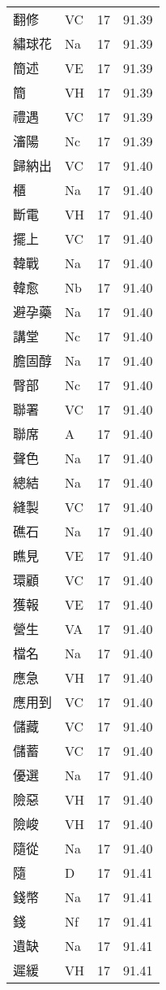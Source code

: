\documentclass[twocolumn]{book}
\begin{document}
\begin{supertabular}{llrr}
翻修 & VC & 17 &  91.39\\
繡球花 & Na & 17 &  91.39\\
簡述 & VE & 17 &  91.39\\
簡 & VH & 17 &  91.39\\
禮遇 & VC & 17 &  91.39\\
瀋陽 & Nc & 17 &  91.39\\
歸納出 & VC & 17 &  91.40\\
櫃 & Na & 17 &  91.40\\
斷電 & VH & 17 &  91.40\\
擺上 & VC & 17 &  91.40\\
韓戰 & Na & 17 &  91.40\\
韓愈 & Nb & 17 &  91.40\\
避孕藥 & Na & 17 &  91.40\\
講堂 & Nc & 17 &  91.40\\
膽固醇 & Na & 17 &  91.40\\
臀部 & Nc & 17 &  91.40\\
聯署 & VC & 17 &  91.40\\
聯席 & A & 17 &  91.40\\
聲色 & Na & 17 &  91.40\\
總結 & Na & 17 &  91.40\\
縫製 & VC & 17 &  91.40\\
礁石 & Na & 17 &  91.40\\
瞧見 & VE & 17 &  91.40\\
環顧 & VC & 17 &  91.40\\
獲報 & VE & 17 &  91.40\\
營生 & VA & 17 &  91.40\\
檔名 & Na & 17 &  91.40\\
應急 & VH & 17 &  91.40\\
應用到 & VC & 17 &  91.40\\
儲藏 & VC & 17 &  91.40\\
儲蓄 & VC & 17 &  91.40\\
優選 & Na & 17 &  91.40\\
險惡 & VH & 17 &  91.40\\
險峻 & VH & 17 &  91.40\\
隨從 & Na & 17 &  91.40\\
隨 & D & 17 &  91.41\\
錢幣 & Na & 17 &  91.41\\
錢 & Nf & 17 &  91.41\\
遺缺 & Na & 17 &  91.41\\
遲緩 & VH & 17 &  91.41\\

\end{supertabular}
\end{document}
